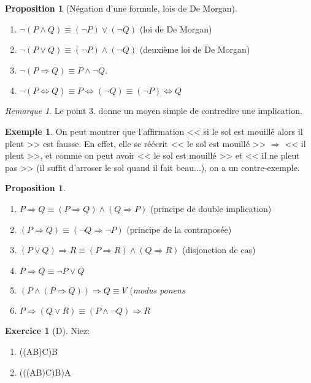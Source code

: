 \documentclass[11pt]{article}
\theoremstyle{definition}
\newtheorem{prop}[defn]{Proposition}
\newtheorem{exe}{Exemple}
\newtheorem{exo}{Exercice}
\theoremstyle{remark}
\newtheorem{rem}{Remarque}
\begin{document}
\begin{prop}[Négation d'une formule, lois de De Morgan]\leavevmode
\begin{enumerate}
\item $\neg(P\land Q) \equiv (\neg P)\lor(\neg Q)$ (loi de De Morgan)
\item $\neg(P\lor Q) \equiv (\neg P)\land (\neg Q)$ (deuxième loi de De Morgan)
\item $\neg(P\Rightarrow Q)\equiv P\land\neg Q$.
\item $\neg(P\Longleftrightarrow Q) \equiv P\Longleftrightarrow (\neg Q) \equiv (\neg P) \Longleftrightarrow Q$
\end{enumerate}
\end{prop}

\begin{rem}
Le point 3. donne un moyen simple de contredire une implication.
\end{rem}

\begin{exe}
On peut montrer que l'affirmation << si le sol est mouillé alors il pleut >> est fausse. En effet, elle se réécrit << le sol est mouillé >> $\Rightarrow $ << il pleut >>, et comme on peut avoir << le sol est mouillé >> et << il ne pleut pas >> (il suffit d'arroser le sol quand il fait beau...), on a un contre-exemple.
\end{exe}

\begin{prop}\leavevmode
\begin{enumerate}
\item $P\Longrightarrow Q\equiv (P\Longrightarrow Q)\land(Q\Longrightarrow P)$ (principe de double implication)
\item $(P\Rightarrow Q)\equiv (\neg Q\Rightarrow \neg P)$ (principe de la contraposée)
\item $(P\lor Q)\Rightarrow R\equiv (P\Rightarrow R)\land (Q\Rightarrow R)$ (disjonction de cas)
\item $P\Rightarrow Q \equiv \neg P\lor Q$
\item $(P\land (P\Rightarrow Q))\Rightarrow Q\equiv V$ (\textit{modus ponens} 
\item $P\Rightarrow(Q\lor R) \equiv (P\land \neg Q)\Rightarrow R $
\end{enumerate}
\end{prop}

\begin{exo}[D]
Niez:\begin{enumerate}
\item ((A\Rightarrow B)\land C)\lor\neg B
\item (((A\Leftrightarrow B)\lor C)\Rightarrow B)\Leftrightarrow A
\end{enumerate}
\end{exo}
\end{document}
